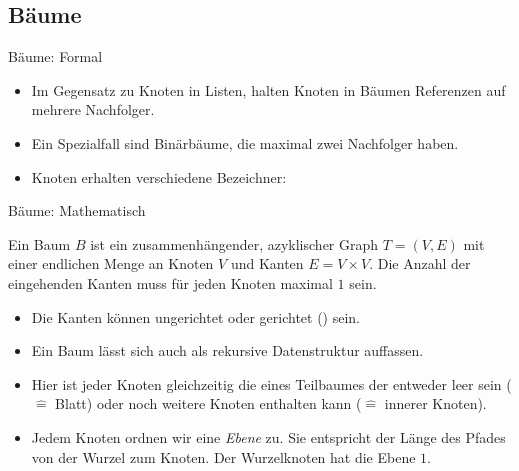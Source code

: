 \subsection{Bäume}
\begin{frame}{Bäume: Formal}
    \begin{itemize}[<+(1)->]
        \widei
        \item Im Gegensatz zu Knoten in Listen, halten Knoten in Bäumen Referenzen auf mehrere Nachfolger.
        \item Ein Spezialfall sind Binärbäume, die maximal zwei Nachfolger haben.
        \item Knoten erhalten verschiedene Bezeichner: 
    \end{itemize}
\end{frame}

\begin{frame}{Bäume: Mathematisch}
    \begin{definition}[Baum]
Ein Baum \(B\) ist ein zusammenhängender, azyklischer Graph \(T = (V,E)\) mit einer endlichen Menge an Knoten \(V\) und Kanten \(E = V \times V\).\pause{} Die Anzahl der eingehenden Kanten muss für jeden Knoten maximal \(1\) sein.
    \end{definition}
    \begin{itemize}[<+(1)->]
        \item Die Kanten können ungerichtet oder gerichtet () sein.
        \item Ein Baum lässt sich auch als rekursive Datenstruktur auffassen.
        \item Hier ist jeder Knoten gleichzeitig die  eines Teilbaumes\pause{} der entweder leer sein (\(\widehat{=}\) Blatt)\pause{} oder noch weitere Knoten enthalten kann (\(\widehat{=}\) innerer Knoten).
        \item Jedem Knoten ordnen wir eine \emph{Ebene} zu. \pause{}Sie entspricht der Länge des Pfades von der Wurzel zum Knoten.\pause{} Der Wurzelknoten hat die Ebene \(1\).
    \end{itemize}
\end{frame}

